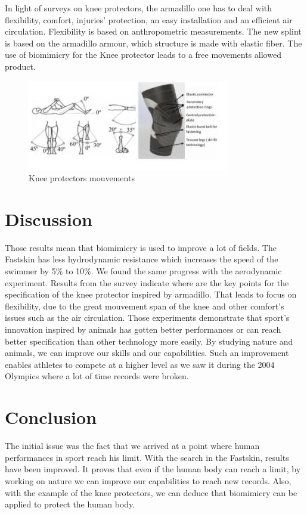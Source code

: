 \documentclass[twoside,twocolumn]{article}                          %
\begin{document}
In light of surveys on knee protectors, the armadillo one has to deal with flexibility, comfort, injuries’ protection, an easy installation and an efficient air circulation. Flexibility is based on anthropometric measurements. The new splint is based on the armadillo armour, which structure is made with elastic fiber. The use of biomimicry for the Knee protector leads to a free movements allowed product.
\begin{figure}[!h]
  \begin{center}
    \includegraphics[scale=1.2]{knee2.JPG}
  \end{center}
  \caption{Knee protectors mouvements}
  \end{figure}

\section{Discussion}
Those results mean that biomimicry is used to improve a lot of fields. The Fastskin has less hydrodynamic resistance  which increases the speed of the swimmer by 5\% to 10\%. We found the same progress with the aerodynamic experiment. Results from the survey indicate where are the key points for the specification of the knee protector inspired by armadillo. That leads to focus on flexibility, due to the great mouvement span of the knee and other comfort’s issues such as the air circulation. Those experiments demonstrate that sport’s innovation inspired by animals has gotten better performances or can reach better specification than other technology more easily. By studying nature and animals, we can improve our skills and our capabilities. Such an improvement enables athletes to compete at a higher level as we saw it during the 2004 Olympics where a lot of time records were broken. 

\section{Conclusion}
The initial issue was the fact that we arrived at a point where human performances in sport reach his limit. With the search in the Fastskin, results have been improved. It proves that even if the human body can reach a limit, by working on nature we can improve our capabilities to reach new records. Also, with the example of the knee protectors, we can deduce that biomimicry can be applied to protect the human body. 
\end{document}
